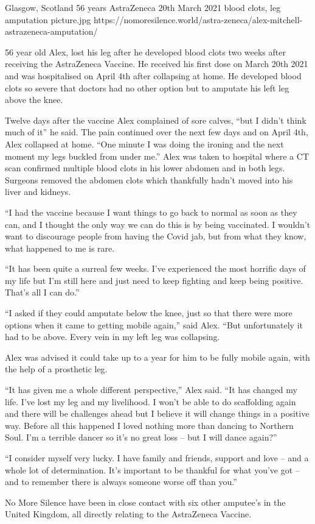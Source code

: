           {Glasgow, Scotland}
          {56 years}
          {AstraZeneca}
          {20th March 2021}
          {blood clots, leg amputation}
          {picture.jpg}
          {https://nomoresilence.world/astra-zeneca/alex-mitchell-astrazeneca-amputation/}
          {

56 year old Alex, lost his leg after he developed blood clots two weeks after
receiving the AstraZeneca Vaccine. He received his first dose on March 20th 2021
and was hospitalised on April 4th after collapsing at home. He developed blood
clots so severe that doctors had no other option but to amputate his left leg
above the knee.

Twelve days after the vaccine Alex complained of sore calves, “but I didn’t
think much of it” he said. The pain continued over the next few days and on
April 4th, Alex collapsed at home. “One minute I was doing the ironing and the
next moment my legs buckled from under me.” Alex was taken to hospital where a
CT scan confirmed multiple blood clots in his lower abdomen and in both
legs. Surgeons removed the abdomen clots which thankfully hadn’t moved into his
liver and kidneys.

“I had the vaccine because I want things to go back to normal as soon as they
can, and I thought the only way we can do this is by being vaccinated. I
wouldn’t want to discourage people from having the Covid jab, but from what they
know, what happened to me is rare.

“It has been quite a surreal few weeks. I’ve experienced the most horrific days
of my life but I’m still here and just need to keep fighting and keep being
positive. That’s all I can do.”

“I asked if they could amputate below the knee, just so that there were more
options when it came to getting mobile again,” said Alex. “But unfortunately it
had to be above. Every vein in my left leg was collapsing.

Alex was advised it could take up to a year for him to be fully mobile again,
with the help of a prosthetic leg.

“It has given me a whole different perspective,” Alex said. “It has changed my
life. I’ve lost my leg and my livelihood. I won’t be able to do scaffolding
again and there will be challenges ahead but I believe it will change things in
a positive way. Before all this happened I loved nothing more than dancing to
Northern Soul. I’m a terrible dancer so it’s no great loss – but I will dance
again?”

“I consider myself very lucky. I have family and friends, support and love – and
a whole lot of determination. It’s important to be thankful for what you’ve got
– and to remember there is always someone worse off than you.”

No More Silence have been in close contact with six other amputee’s in the
United Kingdom, all directly relating to the AstraZeneca Vaccine.

}
